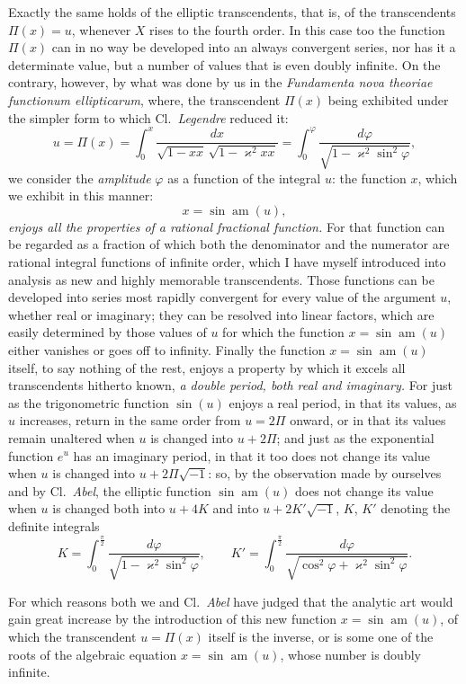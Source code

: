 \documentclass{article}
\begin{document}
Exactly the same holds of the elliptic transcendents, that is, of the transcendents $\Pi(x) = u$, whenever $X$ rises to the fourth order. In this case too the function $\Pi(x)$ can in no way be developed into an always convergent series, nor has it a determinate value, but a number of values that is even doubly infinite. On the contrary, however, by what was done by us in the \emph{Fundamenta nova theoriae functionum ellipticarum}, where, the transcendent $\Pi(x)$ being exhibited under the simpler form to which Cl.\ \emph{Legendre} reduced it:
\[ u = \Pi(x) = \int_0^{x} \frac{dx}{\sqrt{1-xx}\,\sqrt{1-\varkappa^{2}xx}} = \int_0^{\varphi} \frac{d\varphi}{\sqrt{1-\varkappa^{2}\sin^{2}\varphi}}, \]
we consider the \emph{amplitude} $\varphi$ as a function of the integral $u$: the function $x$, which we exhibit in this manner:
\[ x = \sin\operatorname{am}(u), \]
\emph{enjoys all the properties of a rational fractional function.} For that function can be regarded as a fraction of which both the denominator and the numerator are rational integral functions of infinite order, which I have myself introduced into analysis as new and highly memorable transcendents. Those functions can be developed into series most rapidly convergent for every value of the argument $u$, whether real or imaginary; they can be resolved into linear factors, which are easily determined by those values of $u$ for which the function $x = \sin\operatorname{am}(u)$ either vanishes or goes off to infinity. Finally the function $x = \sin\operatorname{am}(u)$ itself, to say nothing of the rest, enjoys a property by which it excels all transcendents hitherto known, \emph{a double period, both real and imaginary.} For just as the trigonometric function $\sin(u)$ enjoys a real period, in that its values, as $u$ increases, return in the same order from $u = 2\Pi$ onward, or in that its values remain unaltered when $u$ is changed into $u + 2\Pi$; and just as the exponential function $e^{u}$ has an imaginary period, in that it too does not change its value when $u$ is changed into $u + 2\Pi\sqrt{-1}$: so, by the observation made by ourselves and by Cl.\ \emph{Abel}, the elliptic function $\sin\operatorname{am}(u)$ does not change its value when $u$ is changed both into $u + 4K$ and into $u + 2K'\sqrt{-1}$, $K$, $K'$ denoting the definite
integrals
\[ K = \int_0^{\frac{\pi}{2}} \frac{d\varphi}{\sqrt{1-\varkappa^{2}\sin^{2}\varphi}}, \qquad K' = \int_0^{\frac{\pi}{2}} \frac{d\varphi}{\sqrt{\cos^{2}\varphi + \varkappa^{2}\sin^{2}\varphi}}. \]

For which reasons both we and Cl.\ \emph{Abel} have judged that the analytic art would gain great increase by the introduction of this new function $x = \sin\operatorname{am}(u)$, of which the transcendent $u = \Pi(x)$ itself is the inverse, or is some one of the roots of the algebraic equation $x = \sin\operatorname{am}(u)$, whose number is doubly infinite.
\end{document}

